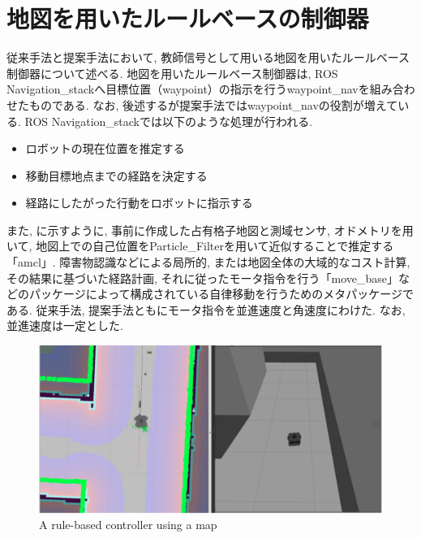 
\section{地図を用いたルールベースの制御器}
従来手法と提案手法において, 教師信号として用いる地図を用いたルールベース制御器について述べる. 地図を用いたルールベース制御器は, ROS Navigation\_stack\cite{navigation:online}へ目標位置（waypoint）の指示を行うwaypoint\_nav\cite{waypoint_nav:online}を組み合わせたものである. なお, 後述するが提案手法ではwaypoint\_navの役割が増えている. ROS Navigation\_stackでは以下のような処理が行われる. 

\begin{itemize}
  \item ロボットの現在位置を推定する
  \item 移動目標地点までの経路を決定する
  \item 経路にしたがった行動をロボットに指示する
\end{itemize}

また, に示すように, 事前に作成した占有格子地図と測域センサ, オドメトリを用いて, 地図上での自己位置をParticle\_Filterを用いて近似することで推定する「amcl」. 障害物認識などによる局所的, または地図全体の大域的なコスト計算, その結果に基づいた経路計画, それに従ったモータ指令を行う「move\_base」などのパッケージによって構成されている自律移動を行うためのメタパッケージである. 従来手法, 提案手法ともにモータ指令を並進速度と角速度にわけた. なお, 並進速度は一定とした.


\begin{figure}[hbtp]
  \centering
 \includegraphics[keepaspectratio, scale=0.7]
      {images/navigation.png}
 \caption{A rule-based controller using a map}
 \label{Fig:navigation}
\end{figure}

\newpage